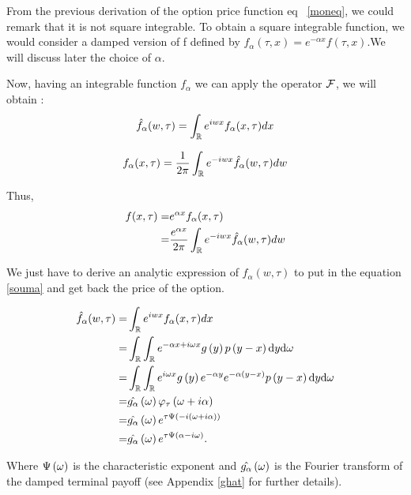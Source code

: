 \documentclass[12pt]{report}
\begin{document}
From the previous derivation of the option price function eq ~\eqref{moneq}, we could remark that it is not square integrable. To obtain a square integrable function, we would consider a damped version of f defined by $f_{\alpha}(\tau,x) = e^{-\alpha x}f(\tau, x)$.We will discuss later  the choice of $\alpha$.

Now, having an integrable function $f_\alpha$ we can apply the operator $\cal{F}$, we will obtain :
\begin{gather}
\hat{f}_{\alpha}(w,\tau)=\int_{\mathbb{R}} e^{iwx} f_{\alpha}(x,\tau) dx 
\end{gather}


\begin{equation}
f_{\alpha}(x,\tau)=\frac{1}{2\pi}\int_{\mathbb{R}} e^{-iwx}\hat{f}_{\alpha}(w,\tau) dw
\end{equation}

Thus,\\
\begin{align}
f(x,\tau)= & e^{\alpha x} f_{\alpha}(x,\tau)\\
= & \frac{e^{\alpha x}}{2\pi}\int_{\mathbb{R}} e^{-iwx}\hat{f}_{\alpha}(w,\tau) dw
\label{souma}
\end{align}

We just have to derive an analytic expression of $f_\alpha(w,\tau)$ to put in the equation \eqref{souma} and get back the price of the option.

\begin{align}
\hat{f}_{\alpha}(w,\tau)= &\int_{\mathbb{R}} e^{iwx} f_{\alpha}(x,\tau) dx \nonumber
\\
= &  \int_{\mathbb{R}} \int_{\mathbb{R}} e^{- \alpha x + i \omega x} g \left( {y} \right)  p \left( {y-x} \right) \textrm{d} y \textrm{d} \omega \nonumber
\\
= & \int_{\mathbb{R}} \int_{\mathbb{R}} e^{ i \omega x} g \left( {y} \right) e^{-\alpha y} e^{-\alpha \left( {y
-x} \right)}  p \left( {y-x} \right) \textrm{d} y \textrm{d} \omega \nonumber
\\
= &\hat {g_{\alpha}} \left( {\omega} \right) \varphi_{\tau} \left( {{\omega + i \alpha}} \right) \nonumber
\\
= & \hat {g_{\alpha}} \left( {\omega} \right) e^{\tau \Psi \left( {{-i \left( {\omega+i \alpha} \right)}} \right) } \nonumber
\\
= & \hat {g_{\alpha}} \left( {\omega} \right) e^{\tau \Psi \left( {{\alpha - i \omega}} \right) }.
\label{ghat}
\end{align}

Where $\Psi \left( {{\omega}} \right) $ is the characteristic exponent and $ \hat {g_{\alpha}} \left( {\omega} \right)$ is the Fourier transform of the damped terminal payoff (see Appendix \eqref{ghat} for further details). \\
\end{document}
